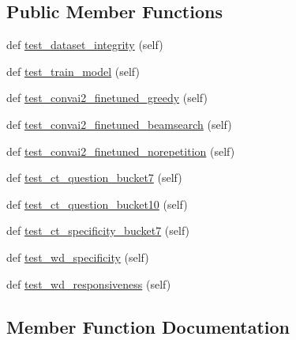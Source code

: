 \subsection*{Public Member Functions}
\begin{DoxyCompactItemize}
\item 
def \hyperlink{classtest__controllable_1_1TestControllableDialogue_afb3df76378e7449db2a4122568d8a8b2}{test\+\_\+dataset\+\_\+integrity} (self)
\item 
def \hyperlink{classtest__controllable_1_1TestControllableDialogue_ad46fe0ecf2f0b42e60424d1c7b37a2f5}{test\+\_\+train\+\_\+model} (self)
\item 
def \hyperlink{classtest__controllable_1_1TestControllableDialogue_af293a117beb40fbfe28314beb4b88f35}{test\+\_\+convai2\+\_\+finetuned\+\_\+greedy} (self)
\item 
def \hyperlink{classtest__controllable_1_1TestControllableDialogue_a436d2be9796b5afb7a4656e614107d48}{test\+\_\+convai2\+\_\+finetuned\+\_\+beamsearch} (self)
\item 
def \hyperlink{classtest__controllable_1_1TestControllableDialogue_a12a49b51265fc21d9f1fe7a8dc45538a}{test\+\_\+convai2\+\_\+finetuned\+\_\+norepetition} (self)
\item 
def \hyperlink{classtest__controllable_1_1TestControllableDialogue_aad1b8cd43766d6bfe04339c5ed7f3830}{test\+\_\+ct\+\_\+question\+\_\+bucket7} (self)
\item 
def \hyperlink{classtest__controllable_1_1TestControllableDialogue_ab33835878eb846bcc457a90072bb06bd}{test\+\_\+ct\+\_\+question\+\_\+bucket10} (self)
\item 
def \hyperlink{classtest__controllable_1_1TestControllableDialogue_a1cf543f3400075fe15ae7eea6b51156c}{test\+\_\+ct\+\_\+specificity\+\_\+bucket7} (self)
\item 
def \hyperlink{classtest__controllable_1_1TestControllableDialogue_a357a886c76cc4d72cc2345eaee912f46}{test\+\_\+wd\+\_\+specificity} (self)
\item 
def \hyperlink{classtest__controllable_1_1TestControllableDialogue_acc29f953a7fb51ef9a0dedafa8129cc2}{test\+\_\+wd\+\_\+responsiveness} (self)
\end{DoxyCompactItemize}


\subsection{Member Function Documentation}
\mbox{\label{classtest__controllable_1_1TestControllableDialogue_a436d2be9796b5afb7a4656e614107d48}} 
